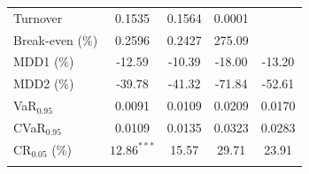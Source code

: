 \documentclass[pdf,10pt,xcolor=dvipsnames,hide notes]{beamer}
\begin{document}
\begin{frame}
\begin{threeparttable}[H]
\begin{tabularx}{\textwidth}{@{\extracolsep{\fill}}lcccc@{}}
			Turnover & 0.1535 & 0.1564 & 0.0001 &  \\
			Break-even (\%) & \cellcolor{corn} 0.2596 & \cellcolor{celadon} 0.2427 & 275.09 &  \\
			MDD1 (\%) & -12.59 & -10.39 & -18.00 & -13.20 \\
			MDD2 (\%) & -39.78 & -41.32 & -71.84 & -52.61 \\
			VaR$_{0.95}$ &  0.0091 & 0.0109 & 0.0209  & 0.0170 \\
			CVaR$_{0.95}$ & 0.0109 & 0.0135 & 0.0323 & 0.0283 \\
			CR$_{0.05}$ (\%) & \cellcolor{corn} $12.86^{***}$ & 15.57 & 29.71  & 23.91  \\
			\bottomrule &  &  &  &
		\end{tabularx}%
		\label{tab:table02}%
	\end{threeparttable}

	\end{frame}
\end{document}
